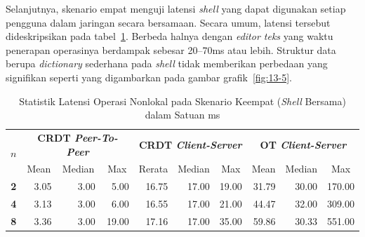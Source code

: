 Selanjutnya, skenario empat menguji latensi \textit{shell} yang dapat digunakan setiap pengguna dalam jaringan secara bersamaan. Secara umum, latensi tersebut dideskripsikan pada tabel~\ref{tab:latency-4}. Berbeda halnya dengan \textit{editor teks} yang waktu penerapan operasinya berdampak sebesar 20--70ms atau lebih. Struktur data berupa \textit{dictionary} sederhana pada \textit{shell} tidak memberikan perbedaan yang signifikan seperti yang digambarkan pada gambar grafik~\ref{fig:13-5}.

\begin{table}[H]
 \centering
\begin{tabular}{|c|rrr|rrr|rrr|}
\hline
\multirow{2}{*}{$n$} & \multicolumn{3}{c|}{\textbf{CRDT \textit{Peer-To-Peer}}} & \multicolumn{3}{c|}{\textbf{CRDT \textit{Client-Server}}} & \multicolumn{3}{c|}{\textbf{OT \textit{Client-Server}}} \\ \cline{2-10}
 & \multicolumn{1}{c|}{Mean} & \multicolumn{1}{c|}{Median} & \multicolumn{1}{c|}{Max} & \multicolumn{1}{c|}{Rerata} & \multicolumn{1}{c|}{Median} & \multicolumn{1}{c|}{Max} & \multicolumn{1}{c|}{Mean} & \multicolumn{1}{c|}{Median} & \multicolumn{1}{c|}{Max} \\ \hline
\textbf{2} & \multicolumn{1}{r|}{3.05} & \multicolumn{1}{r|}{3.00} & 5.00 & \multicolumn{1}{r|}{16.75} & \multicolumn{1}{r|}{17.00} & 19.00 & \multicolumn{1}{r|}{31.79} & \multicolumn{1}{r|}{30.00} & 170.00 \\ \hline
\textbf{4} & \multicolumn{1}{r|}{3.13} & \multicolumn{1}{r|}{3.00} & 6.00 & \multicolumn{1}{r|}{16.55} & \multicolumn{1}{r|}{17.00} & 21.00 & \multicolumn{1}{r|}{44.47} & \multicolumn{1}{r|}{32.00} & 309.00 \\ \hline
\textbf{8} & \multicolumn{1}{r|}{3.36} & \multicolumn{1}{r|}{3.00} & 19.00 & \multicolumn{1}{r|}{17.16} & \multicolumn{1}{r|}{17.00} & 35.00 & \multicolumn{1}{r|}{59.86} & \multicolumn{1}{r|}{30.33} & 551.00 \\ \hline
\end{tabular}
 \caption{Statistik Latensi Operasi Nonlokal pada Skenario Keempat (\textit{Shell} Bersama) dalam Satuan ms}
 \label{tab:latency-4}
\end{table}

